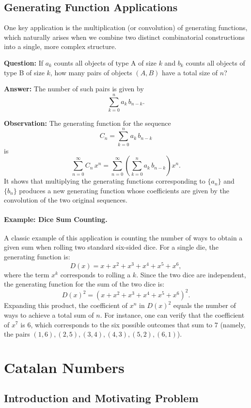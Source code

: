 \documentclass{article}
\begin{document}
\subsection{Generating Function Applications}

One key application is the multiplication (or convolution) of generating functions, which naturally arises when we combine two distinct combinatorial constructions into a single, more complex structure.

\textbf{Question:} If \(a_k\) counts all objects of type A of size \(k\) and \(b_k\) counts all objects of type B of size \(k\), how many pairs of objects \((A, B)\) have a total size of \(n\)?

\textbf{Answer:} The number of such pairs is given by
\[
\sum_{k=0}^{n} a_k\, b_{n-k}.
\]

\textbf{Observation:} The generating function for the sequence
\[
C_n = \sum_{k=0}^{n} a_k\, b_{n-k}
\]
is
\[
\sum_{n=0}^{\infty} C_n\, x^n = \sum_{n=0}^{\infty} \left(\sum_{k=0}^{n} a_k\, b_{n-k}\right)x^n.
\]
It shows that multiplying the generating functions corresponding to \( \{a_n\} \) and \( \{b_n\} \) produces a new generating function whose coefficients are given by the convolution of the two original sequences.


\paragraph{Example: Dice Sum Counting.}  
A classic example of this application is counting the number of ways to obtain a given sum when rolling two standard six-sided dice. For a single die, the generating function is:
\[
D(x) = x + x^2 + x^3 + x^4 + x^5 + x^6,
\]
where the term \(x^k\) corresponds to rolling a \(k\). Since the two dice are independent, the generating function for the sum of the two dice is:
\[
D(x)^2 = \left(x + x^2 + x^3 + x^4 + x^5 + x^6\right)^2.
\]
Expanding this product, the coefficient of \(x^n\) in \(D(x)^2\) equals the number of ways to achieve a total sum of \(n\). For instance, one can verify that the coefficient of \(x^7\) is 6, which corresponds to the six possible outcomes that sum to 7 (namely, the pairs \((1,6), (2,5), (3,4), (4,3), (5,2), (6,1)\)).

\section{Catalan Numbers}
\subsection{Introduction and Motivating Problem}
\end{document}

